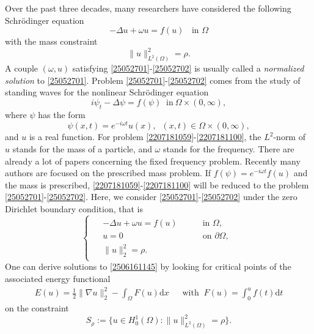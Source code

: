 \documentclass[10pt]{article}
\numberwithin{equation}{section}
\newcommand{\ud}{\mathrm{d}}
\numberwithin{equation}{section}
\begin{document}
\smallskip
Over the past three decades, many researchers have considered the following Schr\"{o}dinger equation
\begin{equation}\label{25052701}
-\Delta u+\omega u=f(u)\;\; \text { in } \Omega
\end{equation}
with the mass constraint
\begin{equation}\label{25052702}
\|u\|^2_{L^2(\Omega)}=\rho.
\end{equation}
A couple  $(\omega, u)$ satisfying \eqref{25052701}-\eqref{25052702}  is usually called a {\it normalized solution} to \eqref{25052701}. Problem \eqref{25052701}-\eqref{25052702} comes from the study of standing waves for the nonlinear Schr\"{o}dinger equation
\begin{equation}\label{2207181059}
    i\psi_t-\Delta \psi =f(\psi) \;\; \text{in}~ \Omega\times (0,\infty),
\end{equation}
where $\psi$ has the form
\begin{equation}\label{2207181100}
\psi(x,t)=e^{-i\omega t} u(x),\;\; (x,t)\in \Omega\times (0,\infty),
\end{equation}
and $u$ is a real function. For problem \eqref{2207181059}-\eqref{2207181100}, the $L^2$-norm of $u$ stands for the mass of a particle, and $\omega$ stands for the frequency. There are already a lot of papers concerning the fixed frequency problem. Recently many authors are focused on the prescribed mass problem. If $f(\psi)=e^{-i\omega t}f(u)$ and the mass is prescribed, \eqref{2207181059}-\eqref{2207181100} will be reduced to the problem \eqref{25052701}-\eqref{25052702}. Here, we consider \eqref{25052701}-\eqref{25052702} under the zero Dirichlet boundary condition, that is
\begin{equation}\label{2506161145}
\begin{cases}
\begin{aligned}
&-\Delta u+\omega u=f(u) \quad &&\text { in } \Omega, \\
&u=0  &&\text { on } \partial\Omega, \\
&\|u\|_2^2=\rho.
\end{aligned}
\end{cases}
\end{equation}
One can derive solutions to \eqref{2506161145} by looking for critical points of the associated energy functional
\begin{equation}\label{2303021513}
\begin{aligned}
E(u)=\frac{1}{2}\|\nabla u\|_2^2 -\int_{\Omega}F(u) \ud x \quad\;\; \mbox{with}\;\; F(u) =\int_0^{u}f(t)\ud t
\end{aligned}
\end{equation}
on the constraint
\[
S_{\rho}:=\{u\in H^1_0(\Omega):\|u\|^2_{L^2(\Omega)}=\rho\}.
\]
\end{document}
